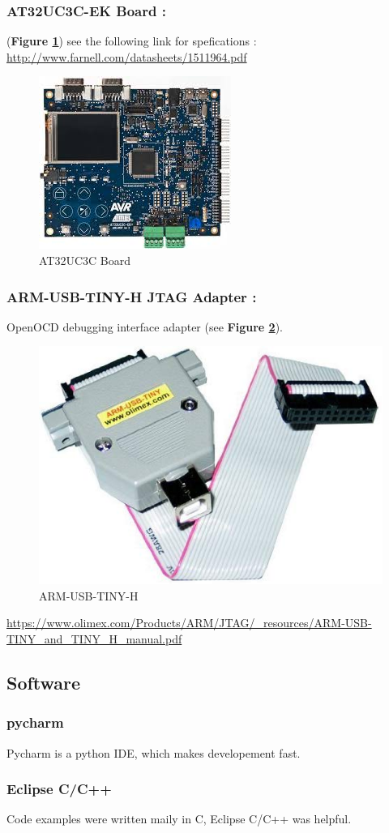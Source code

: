\subsubsection{AT32UC3C-EK Board : } (\textbf{Figure \ref{AT32UC3C Board}}) see the following link for spefications :  {\color{blue}\url{http://www.farnell.com/datasheets/1511964.pdf}} 
		\begin{figure}[H]
			\centering
        	\includegraphics[scale=0.40]{img/mean/avr32.jpeg}
        	\caption{AT32UC3C Board}
        	\label{AT32UC3C Board}
    	\end{figure}

\subsubsection{ARM-USB-TINY-H JTAG Adapter : }  OpenOCD debugging interface adapter (see \textbf{Figure \ref{ARM-USB-TINY-H}}).
		\begin{figure}[H]
			\centering
        	\includegraphics[scale=0.25]{img/mean/arm-usb-tiny-h.jpg}
        	\caption{ARM-USB-TINY-H}
        	\label{ARM-USB-TINY-H}
    	\end{figure}
{\color{blue}\url{https://www.olimex.com/Products/ARM/JTAG/_resources/ARM-USB-TINY_and_TINY_H_manual.pdf}}
\subsection{Software}
\subsubsection{pycharm}
Pycharm is a python IDE, which makes developement fast.
\subsubsection{Eclipse C/C++}
Code examples were written maily in C, Eclipse C/C++ was helpful. 